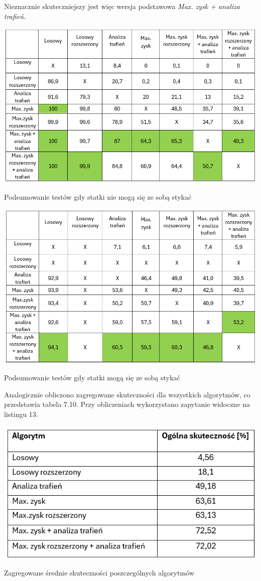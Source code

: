 Nieznacznie skuteczniejszy jest więc wersja podstawowa \emph{Max. zysk + analiza trafień}.
\begin{table}[!h]
    \centering
    \includegraphics[width=1\linewidth]{img/summary-ships-cant-touch.PNG}
    \caption{Podsumowanie testów gdy statki nie mogą się ze sobą stykać}
\end{table}

\begin{table}[!h]
    \centering
    \includegraphics[width=1\linewidth]{img/summary-ships-can-touch.PNG}
    \caption{Podsumowanie testów gdy statki mogą się ze sobą stykać}
\end{table}

Analogicznie obliczono zagregowane skuteczności dla wszystkich algorytmów, co przedstawia tabela 7.10. Przy obliczeniach wykorzystano zapytanie widoczne na listingu 13.

\begin{table}[!h]
    \centering
    \includegraphics[width=0.7\linewidth]{img/aggregate.PNG}
    \caption{Zagregowane średnie skuteczności poszczególnych algorytmów}
\end{table}


